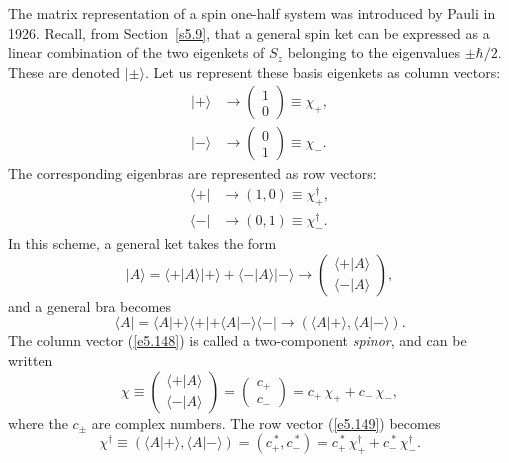The matrix representation of a  spin one-half system was introduced by Pauli in 1926. 
Recall, from Section~\ref{s5.9}, that a general spin ket can be expressed as
a linear combination of the two eigenkets of $S_z$ belonging to the
eigenvalues $\pm \hbar/2$. These are denoted  $|\pm\rangle$. Let us
represent these basis eigenkets as column vectors:
\begin{align}
|+\rangle&\rightarrow \left(\!\begin{array}{c}1\\0\end{array}\!\right) \equiv \chi_+,\\[0.5ex]
|-\rangle &\rightarrow \left(\!\begin{array}{c}0\\1\end{array}\!\right) \equiv \chi_-.
\end{align}
The corresponding eigenbras are represented as row vectors:
\begin{align}
\langle +| &\rightarrow (1, 0) \equiv \chi_+^{\dag}, \\[0.5ex]
\langle - |&\rightarrow (0, 1) \equiv \chi_-^{\dag}.
\end{align}
In this scheme, a general  ket takes the form 
\begin{equation}\label{e5.148}
|A\rangle = \langle +|A\rangle |+\rangle + \langle -|A\rangle |-\rangle
\rightarrow
\left(\!\begin{array}{c}\langle +|A\rangle\\
\langle -|A\rangle\end{array}\!\right),
\end{equation}
and a general bra becomes
\begin{equation}\label{e5.149}
\langle A| =\langle A|+\rangle \langle +| + \langle A|-\rangle \langle -|
\rightarrow (\langle A|+\rangle, \langle A|-\rangle).
\end{equation}
The column vector (\ref{e5.148})  is called a two-component {\em spinor}, and can be written
\begin{equation}
\chi \equiv \left(\!\begin{array}{c}\langle +|A\rangle\\
\langle -|A\rangle\end{array}\!\right) =\left(\!\begin{array}{c}
c_+\\ c_- \end{array}\!\right) = c_+\, \chi_+ + c_- \,\chi_-,
\end{equation}
where the $c_\pm$ are complex numbers. The row vector (\ref{e5.149}) becomes
\begin{equation}
\chi^{\dag} \equiv (\langle A|+\rangle, \langle A|-\rangle) =(c_+^{~\ast}, c_-^{~\ast}) =c_+^{~\ast}\, \chi_+^{\dag} + c_-^{~\ast}\,\chi_-^{\dag}.
\end{equation}

